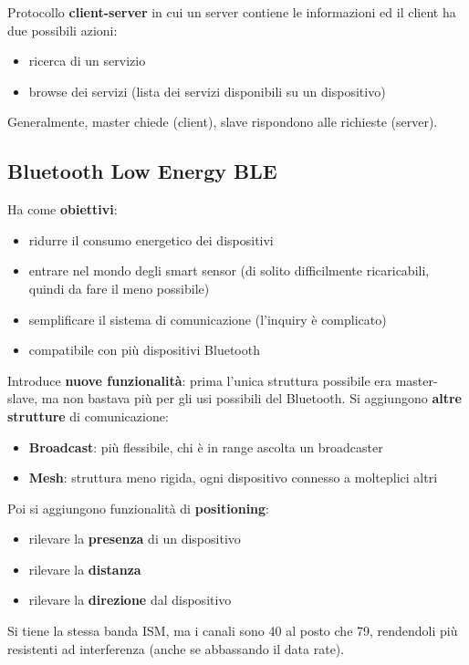 Protocollo \textbf{client-server} in cui un server contiene le informazioni ed il client ha due possibili azioni:
\begin{itemize}
	\item ricerca di un servizio
	\item browse dei servizi (lista dei servizi disponibili su un dispositivo)
\end{itemize}
Generalmente, master chiede (client), slave rispondono alle richieste (server).

\subsection{Bluetooth Low Energy BLE}

Ha come \textbf{obiettivi}:
\begin{itemize}
	\item ridurre il consumo energetico dei dispositivi
	\item entrare nel mondo degli smart sensor (di solito difficilmente ricaricabili, quindi da fare il meno possibile)
	\item semplificare il sistema di comunicazione (l'inquiry è complicato)
	\item compatibile con più dispositivi Bluetooth
\end{itemize} 

Introduce \textbf{nuove funzionalità}: prima l'unica struttura possibile era master-slave, ma non bastava più per gli usi possibili del Bluetooth. Si aggiungono \textbf{altre strutture} di comunicazione:
\begin{itemize}
	\item \textbf{Broadcast}: più flessibile, chi è in range ascolta un broadcaster
	\item \textbf{Mesh}: struttura meno rigida, ogni dispositivo connesso a molteplici altri
\end{itemize}

Poi si aggiungono funzionalità di \textbf{positioning}: 
\begin{itemize}
	\item rilevare la \textbf{presenza} di un dispositivo
	\item rilevare la \textbf{distanza}
	\item rilevare la \textbf{direzione} dal dispositivo
\end{itemize}

Si tiene la stessa banda ISM, ma i canali sono 40 al posto che 79, rendendoli più resistenti ad interferenza (anche se abbassando il data rate). 

